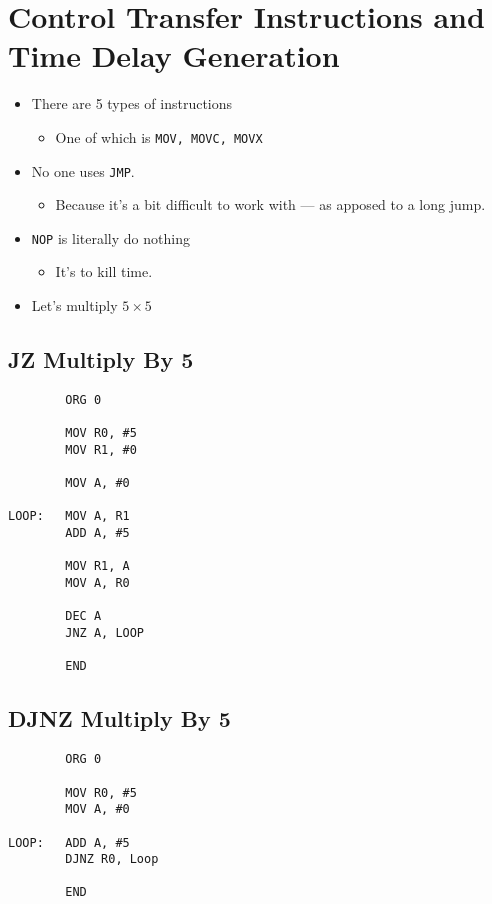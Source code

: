 \documentclass[12pt]{article}
\begin{document}
\section{Control Transfer Instructions and Time Delay Generation}
\begin{itemize}
    \item There are 5 types of instructions
    \begin{itemize}
         \item One of which is \texttt{MOV, MOVC, MOVX}
    \end{itemize}

    \item No one uses \texttt{JMP}.
    \begin{itemize}
        \item Because it's a bit difficult to work with --- as apposed to a long jump.
    \end{itemize}

    \item \texttt{NOP} is literally do nothing
    \begin{itemize}
        \item It's to kill time.
    \end{itemize}

    \item Let's multiply $5 \times 5$
\end{itemize}

\subsection*{JZ Multiply By 5}
\begin{verbatim}
        ORG 0

        MOV R0, #5
        MOV R1, #0

        MOV A, #0

LOOP:   MOV A, R1
        ADD A, #5

        MOV R1, A
        MOV A, R0

        DEC A
        JNZ A, LOOP

        END
\end{verbatim}

\subsection*{DJNZ Multiply By 5}
\begin{verbatim}
        ORG 0

        MOV R0, #5
        MOV A, #0

LOOP:   ADD A, #5
        DJNZ R0, Loop

        END
\end{verbatim}
\end{document}
